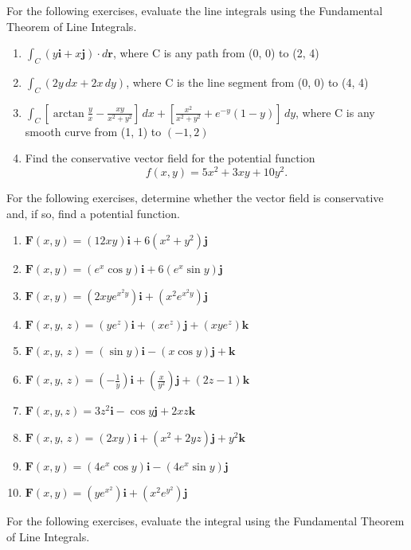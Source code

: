 \documentclass{exercises}
\begin{document}
For the following exercises, evaluate the line integrals using the Fundamental Theorem of Line Integrals.

\begin{enumerate}[resume]
\item $\int_{C}(y\mathbf{i}+x\mathbf{j})\cdot d\mathbf{r}$, where C is any path from (0, 0) to (2, 4)
\item $\int_{C}(2y\,dx+2x\,dy)$, where C is the line segment from (0, 0) to (4, 4)
\item \techrequired $\int_{C}[\arctan \frac{y}{x}-\frac{xy}{x^{2}+y^{2}}]\,dx+[\frac{x^{2}}{x^{2}+y^{2}}+e^{-y}(1-y)]\,dy$, where C is any smooth curve from (1, 1) to $(-1,2)$
\item Find the conservative vector field for the potential function \[f(x,y)=5x^{2}+3xy+10y^{2}.\]
\end{enumerate}

For the following exercises, determine whether the vector field is conservative and, if so, find a potential function.

\begin{enumerate}[resume]
\item $\mathbf{F}(x,y)=(12xy)\mathbf{i}+6(x^{2}+y^{2})\mathbf{j}$
\item $\mathbf{F}(x,y)=(e^{x}\cos y)\mathbf{i}+6(e^{x}\sin y)\mathbf{j}$
\item $\mathbf{F}(x,y)=(2xye^{x^{2}y})\mathbf{i}+(x^{2}e^{x^{2}y})\mathbf{j}$
\item $\mathbf{F}(x,y,\,z)=(ye^{z})\mathbf{i}+(xe^{z})\mathbf{j}+(xye^{z})\mathbf{k}$
\item $\mathbf{F}(x,y,\,z)=(\sin y)\mathbf{i}-(x\cos y)\mathbf{j}+\mathbf{k}$
\item $\mathbf{F}(x,y,\,z)=(-\frac{1}{y})\mathbf{i}+(\frac{x}{y^{2}})\mathbf{j}+(2z-1)\mathbf{k}$
\item $\mathbf{F}(x,y,z)=3z^{2}\mathbf{i}-\cos y\mathbf{j}+2xz\mathbf{k}$
\item $\mathbf{F}(x,y,\,z)=(2xy)\mathbf{i}+(x^{2}+2yz)\mathbf{j}+y^{2}\mathbf{k}$
\item $\mathbf{F}(x,y)=(4e^{x}\cos y)\mathbf{i}-(4e^{x}\sin y)\mathbf{j}$
\item $\mathbf{F}(x,y)=(ye^{x^{2}})\mathbf{i}+(x^{2}e^{y^{2}})\mathbf{j}$
\end{enumerate}

For the following exercises, evaluate the integral using the Fundamental Theorem of Line Integrals.
\end{document}
